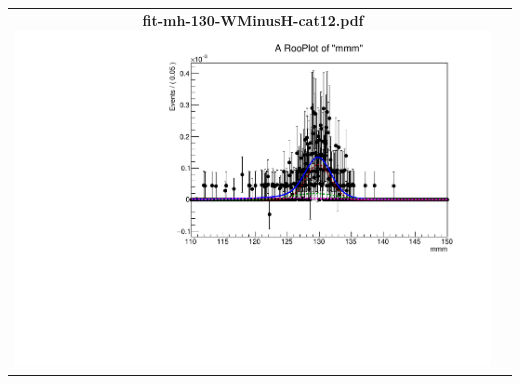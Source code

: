 \begin{longtable}{|c|c|}
{}
 \\
\hline
\parbox{0.49\textwidth}{
\centering
{\bfseries fit-mh-130-WMinusH-cat12.pdf}
\includegraphics[width=.49\textwidth]{figures/signal_model/AppendixBdt/WMinusH/130/fit_mh_130_WMinusH_cat12.pdf}
}
 & \\ \hline
\end{longtable}
